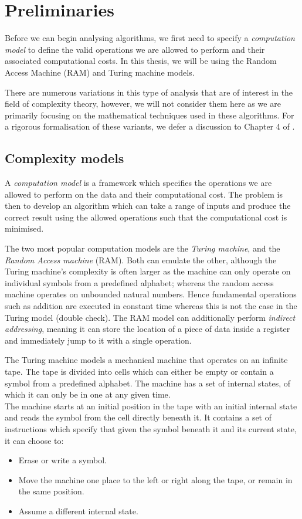 \chapter{Preliminaries}\label{chp:preliminaries}

Before we can begin analysing algorithms, we first need to specify a \emph{computation model} to define the valid operations we are allowed to perform and their associated computational costs. In this thesis, we will be using the Random Access Machine (RAM) and Turing machine models.

There are numerous variations in this type of analysis that are of interest in the field of complexity theory, however, we will not consider them here as we are primarily focusing on the mathematical techniques used in these algorithms. For a rigorous formalisation of these variants, we defer a discussion to Chapter 4 of \cite{burgisser}.

\section{Complexity models}%
\label{sec:Complexity models}

A \textit{computation model} is a framework which specifies the operations we are allowed to perform on the data and their computational cost. The problem is then to develop an algorithm which can take a range of inputs and produce the correct result using the allowed operations such that the computational cost is minimised.

The two most popular computation models are the \textit{Turing machine}, and the \textit{Random Access machine} (RAM). Both can emulate the other, although the Turing machine's complexity is often larger as the machine can only operate on individual symbols from a predefined alphabet; whereas the random access machine operates on unbounded natural numbers. Hence fundamental operations such as addition are executed in constant time whereas this is not the case in the Turing model (double check). The RAM model can additionally perform \emph{indirect addressing}, meaning it can store the location of a piece of data inside a register and immediately jump to it with a single operation.

The Turing machine models a mechanical machine that operates on an infinite tape. The tape is divided into cells which can either be empty or contain a symbol from a predefined alphabet. The machine has a set of internal states, of which it can only be in one at any given time.\\
The machine starts at an initial position in the tape with an initial internal state and reads the symbol from the cell directly beneath it. It contains a set of instructions which specify that given the symbol beneath it and its current state, it can choose to:
\begin{itemize}
    \item Erase or write a symbol.
    \item Move the machine one place to the left or right along the tape, or remain in the same position.
    \item Assume a different internal state.
\end{itemize}

